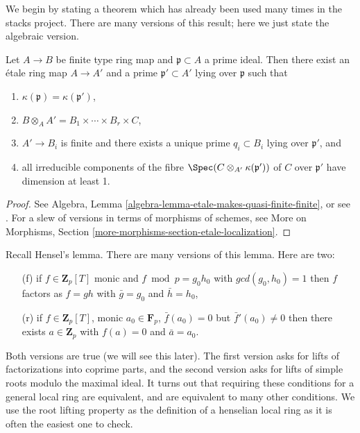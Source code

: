 \noindent
We begin by stating a theorem which has already been used many times
in the stacks project. There are many versions of this result; here we
just state the algebraic version.

\begin{theorem}
\label{theorem-quasi-finite-etale-locally}
Let $A\to B$ be finite type ring map and $\mathfrak p \subset A$ a prime
ideal. Then there exist an \'etale ring map $A \to A'$ and a prime
$\mathfrak p' \subset A'$ lying over $\mathfrak p$ such that
\begin{enumerate}
\item
$\kappa(\mathfrak p) = \kappa(\mathfrak p')$,
\item
$ B \otimes_A A' = B_1\times \cdots \times B_r \times C$,
\item
$ A'\to B_i$ is finite and there exists a unique prime $q_i\subset B_i$ lying
over $\mathfrak p'$, and
\item all irreducible components of the fibre
$\Spec(C \otimes_{A'} \kappa(\mathfrak p'))$ of $C$ over $\mathfrak p'$
have dimension at least 1.
\end{enumerate}
\end{theorem}

\begin{proof}
See Algebra, Lemma \ref{algebra-lemma-etale-makes-quasi-finite-finite}, or
see \cite[Th\'eor\`eme 18.12.1]{EGA4}. For a slew of versions in terms of
morphisms of schemes, see
More on Morphisms, Section \ref{more-morphisms-section-etale-localization}.
\end{proof}

\noindent
Recall Hensel's lemma.
There are many versions of this lemma. Here are two:
\begin{enumerate}
\item[(f)] if $f\in \mathbf{Z}_p[T]$ monic and
$f \bmod p = g_0 h_0$ with $gcd(g_0, h_0) = 1$ then $f$ factors
as $f = gh$ with $\bar g = g_0$ and $\bar h = h_0$,
\item[(r)] if $f \in \mathbf{Z}_p[T]$, monic $a_0 \in \mathbf{F}_p$,
$\bar f(a_0) =0$ but $\bar f'(a_0) \neq 0$
then there exists $a \in \mathbf{Z}_p$ with
$f(a) = 0$ and $\bar a = a_0$.
\end{enumerate}
Both versions are true (we will see this later). The first version
asks for lifts of factorizations into coprime parts,
and the second version asks for lifts of simple roots
modulo the maximal ideal. It turns out that requiring
these conditions for a general local ring are equivalent, and are
equivalent to many other conditions. We use the root lifting
property as the definition of a henselian local ring as it is
often the easiest one to check.

